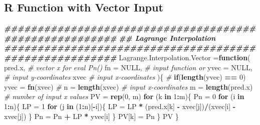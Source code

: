 \documentclass[
]{book}
\newenvironment{Shaded}{\begin{snugshade}}{\end{snugshade}}
\newcommand{\AttributeTok}[1]{\textcolor[rgb]{0.13,0.29,0.53}{#1}}
\newcommand{\CommentTok}[1]{\textcolor[rgb]{0.56,0.35,0.01}{\textit{#1}}}
\newcommand{\ConstantTok}[1]{\textcolor[rgb]{0.56,0.35,0.01}{#1}}
\newcommand{\ControlFlowTok}[1]{\textcolor[rgb]{0.13,0.29,0.53}{\textbf{#1}}}
\newcommand{\DecValTok}[1]{\textcolor[rgb]{0.00,0.00,0.81}{#1}}
\newcommand{\DocumentationTok}[1]{\textcolor[rgb]{0.56,0.35,0.01}{\textbf{\textit{#1}}}}
\newcommand{\FunctionTok}[1]{\textcolor[rgb]{0.13,0.29,0.53}{\textbf{#1}}}
\newcommand{\NormalTok}[1]{#1}
\newcommand{\OtherTok}[1]{\textcolor[rgb]{0.56,0.35,0.01}{#1}}
\newcommand{\SpecialCharTok}[1]{\textcolor[rgb]{0.81,0.36,0.00}{\textbf{#1}}}
\begin{document}
\hypertarget{r-function-with-vector-input}{%
\subsection{R Function with Vector Input}\label{r-function-with-vector-input}}

\begin{Shaded}
\begin{Highlighting}[]
\DocumentationTok{\#\#\#\#\#\#\#\#\#\#\#\#\#\#\#\#\#\#\#\#\#\#\#\#\#\#\#\#\#\#\#\#\#\#\#\#\#\#\#\#\#\#\#\#\#\#\#\#\#\#\#\#\#\#\#}
\DocumentationTok{\#\#        Lagrange Interpolation}
\DocumentationTok{\#\#\#\#\#\#\#\#\#\#\#\#\#\#\#\#\#\#\#\#\#\#\#\#\#\#\#\#\#\#\#\#\#\#\#\#\#\#\#\#\#\#\#\#\#\#\#\#\#\#\#\#\#\#\#}
\NormalTok{Lagrange.Interpolation.Vector }\OtherTok{=}\ControlFlowTok{function}\NormalTok{(}
\NormalTok{                        pred.x,      }\CommentTok{\# vector x for eval Pn() }
                        \AttributeTok{fn =} \ConstantTok{NULL}\NormalTok{,   }\CommentTok{\# input function or}
                        \AttributeTok{yvec =} \ConstantTok{NULL}\NormalTok{, }\CommentTok{\# input y{-}coordinates}
\NormalTok{                        xvec         }\CommentTok{\# input x{-}coordinates}
\NormalTok{                        )\{}
  \CommentTok{\# }
  \ControlFlowTok{if}\NormalTok{(}\FunctionTok{length}\NormalTok{(yvec) }\SpecialCharTok{==} \DecValTok{0}\NormalTok{) yvec }\OtherTok{=} \FunctionTok{fn}\NormalTok{(xvec) }\CommentTok{\#}
\NormalTok{  n }\OtherTok{=} \FunctionTok{length}\NormalTok{(xvec)       }\CommentTok{\# input x{-}coordinates}
\NormalTok{  m }\OtherTok{=} \FunctionTok{length}\NormalTok{(pred.x)     }\CommentTok{\# number of input x values}
\NormalTok{  PV }\OtherTok{=} \FunctionTok{rep}\NormalTok{(}\DecValTok{0}\NormalTok{, m)}
  \ControlFlowTok{for}\NormalTok{ (k }\ControlFlowTok{in} \DecValTok{1}\SpecialCharTok{:}\NormalTok{m)\{}
\NormalTok{     Pn }\OtherTok{=} \DecValTok{0}
     \ControlFlowTok{for}\NormalTok{ (i }\ControlFlowTok{in} \DecValTok{1}\SpecialCharTok{:}\NormalTok{n)\{}
\NormalTok{         LP }\OtherTok{=} \DecValTok{1}
         \ControlFlowTok{for}\NormalTok{ (j }\ControlFlowTok{in}\NormalTok{ (}\DecValTok{1}\SpecialCharTok{:}\NormalTok{n)[}\SpecialCharTok{{-}}\NormalTok{i])\{  }
\NormalTok{              LP }\OtherTok{=}\NormalTok{ LP }\SpecialCharTok{*}\NormalTok{ (pred.x[k] }\SpecialCharTok{{-}}\NormalTok{ xvec[j])}\SpecialCharTok{/}\NormalTok{(xvec[i] }\SpecialCharTok{{-}}\NormalTok{ xvec[j])}
\NormalTok{             \}}
\NormalTok{         Pn }\OtherTok{=}\NormalTok{ Pn }\SpecialCharTok{+}\NormalTok{ LP }\SpecialCharTok{*}\NormalTok{ yvec[i]}
\NormalTok{       \}}
\NormalTok{     PV[k] }\OtherTok{=}\NormalTok{ Pn}
\NormalTok{    \}}
\NormalTok{   PV}
\NormalTok{  \}}
\end{Highlighting}
\end{Shaded}
\end{document}
